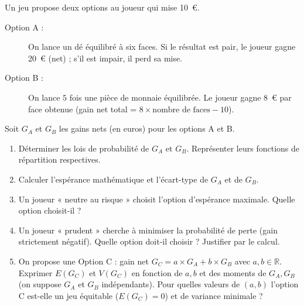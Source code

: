 \documentclass[11pt]{article}
\begin{document}
\begin{exercice}
Un jeu propose deux options au joueur qui mise \SI{10}{\euro}.
\begin{description}
    \item[Option A :] On lance un dé équilibré à six faces. Si le résultat est pair, le joueur gagne \SI{20}{\euro} (net) ; s'il est impair, il perd sa mise.
    \item[Option B :] On lance $5$ fois une pièce de monnaie équilibrée. Le joueur gagne \SI{8}{\euro} par face obtenue (gain net total = $8 \times \text{nombre de faces} - 10$).
\end{description}
Soit $G_A$ et $G_B$ les gains nets (en euros) pour les options A et B.
\begin{enumerate}
    \item Déterminer les lois de probabilité de $G_A$ et $G_B$. Représenter leurs fonctions de répartition respectives.
    \item Calculer l'espérance mathématique et l'écart-type de $G_A$ et de $G_B$.
    \item Un joueur « neutre au risque » choisit l'option d'espérance maximale. Quelle option choisit-il ?
    \item Un joueur « prudent » cherche à minimiser la probabilité de perte (gain strictement négatif). Quelle option doit-il choisir ? Justifier par le calcul.
    \item On propose une Option C : gain net $G_C = a \times G_A + b \times G_B$ avec $a,b \in \mathbb{R}$. Exprimer $E(G_C)$ et $V(G_C)$ en fonction de $a,b$ et des moments de $G_A, G_B$ (on suppose $G_A$ et $G_B$ indépendants). Pour quelles valeurs de $(a,b)$ l'option C est-elle un jeu équitable ($E(G_C)=0$) et de variance minimale ?
\end{enumerate}
\end{exercice}
\end{document}
